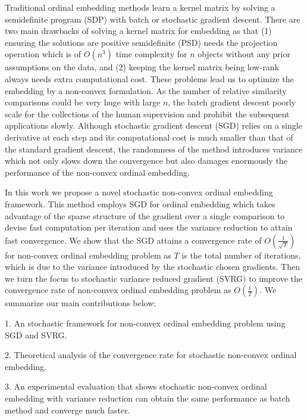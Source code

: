 \documentclass[letterpaper]{article}
\begin{document}
		Traditional ordinal embedding methods learn a kernel matrix by solving a semidefinite program (SDP) with batch \cite{agarwal2007generalized,tamuz2011adaptiive,vandermaaten2012stochastic} or stochastic \cite{doi:10.1137/1.9781611974010.31} gradient descent. There are two main drawbacks of solving a kernel matrix for embedding as that (1) ensuring the solutions are positive semidefinite (PSD) needs the projection operation which is of $O(n^3)$ time complexity for $n$ objects without any prior assumptions on the data, and (2) keeping the kernel matrix being low-rank always needs extra computational cost. These problems lead us to optimize the embedding by a non-convex formulation. As the number of relative similarity comparisons could be very huge with large $n$, the batch gradient descent poorly scale for the collections of the human supervision and prohibit the subsequent applications slowly. Although stochastic gradient descent (SGD) relies on a single derivative at each step and its computational cost is much smaller than that of the standard gradient descent, the randomness of the method introduces variance which not only slows down the convergence but also damages enormously the performance of the non-convex ordinal embedding.
		
		In this work we propose a novel stochastic non-convex ordinal embedding framework. This method employs SGD for ordinal embedding which takes advantage of the sparse structure of the gradient over a single comparison to devise fast computation per iteration and uses the variance reduction to attain fast convergence. We show that the SGD attains a convergence rate of $O(\frac{1}{\sqrt{T}})$ for non-convex ordinal embedding problem as $T$ is the total number of iterations, which is due to the variance introduced by the stochastic chosen gradients. Then we turn the focus to stochastic variance reduced gradient (SVRG) \cite{rie2013accelerating} to improve the convergence rate of non-convex ordinal embedding problem as $O(\frac{1}{T})$. We summarize our main contributions below:
		
		1. An stochastic framework for non-convex ordinal embedding problem using SGD and SVRG.
		
		2. Theoretical analysis of the convergence rate for stochastic non-convex ordinal embedding.

		3. An experimental evaluation that shows stochastic non-convex ordinal embedding with variance reduction can obtain the same performance as batch method and converge much faster.
\end{document}
